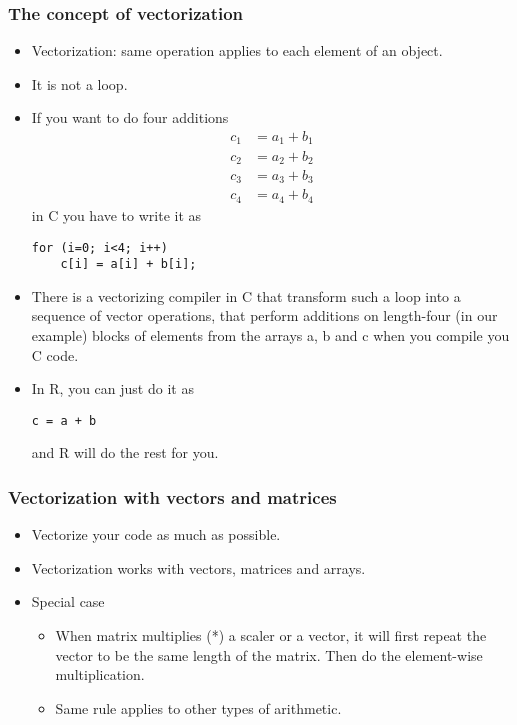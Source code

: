\documentclass[10pt]{beamer}
\begin{document}
\begin{frame}[fragile]
  \frametitle{The concept of vectorization}
  \begin{itemize}
  \item Vectorization: same operation applies to each element of an object.
  \item It is not a loop.

  \item   If you want to do four additions
    \begin{align*} c_1 & = a_1 + b_1 \\ c_2 & = a_2 + b_2 \\ c_3 & = a_3 + b_3
      \\ c_4 & = a_4 + b_4 \end{align*}
    in C you have to write it as
\begin{verbatim}
for (i=0; i<4; i++)
    c[i] = a[i] + b[i];
\end{verbatim}

  \item There is a vectorizing compiler in C that transform such a
    loop into a sequence of vector operations, that perform additions
    on length-four (in our example) blocks of elements from the arrays
    a, b and c when you compile you C code.

  \item In R, you can just do it as

\begin{verbatim}
c = a + b
\end{verbatim}

and R will do the rest for you.

  \end{itemize}
\end{frame}


\begin{frame}
  \frametitle{Vectorization with vectors and matrices}

  \begin{itemize}
  \item Vectorize your code as much as possible.

  \item Vectorization works with vectors, matrices and arrays.

  \item Special case

    \begin{itemize}
    \item When matrix multiplies (*) a scaler or a vector, it will
      first repeat the vector to be the same length of the
      matrix. Then do the element-wise multiplication.

    \item Same rule applies to other types of arithmetic.

    \end{itemize}

  \end{itemize}
\end{frame}
\end{document}
